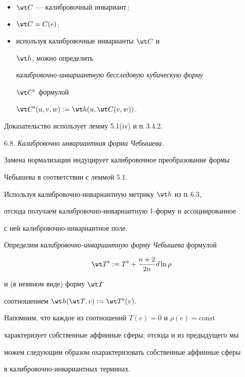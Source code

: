 \begin{itemize}

\item[(i)] $\wt C$ --- калибровочный инвариант\,;

\item[(ii)] $\wt C = C(e)$;

\item[(iii)] используя калибровочные инварианты $\wt C$ и

$\wt h$, можно определить

{\it калибровочно-ин\-ва\-ри\-ант\-ную бесследовую кубическую форму}

$\wt C^{\flat}$ формулой

$\wt C^{\flat}(u,v,w):= \wt h (u,\wt C (v,w))$.

\end{itemize}



Доказательство использует лемму 5.1(iv) и п.\,3.4.2.

\medskip



6.8. {\it Калибровочно инвариантная форма Чебышева.}

Замена нормализации индуцирует калибровочное преобразование формы

Чебышева в соответствии с леммой 5.1.

Используя ка\-либ\-ро\-воч\-но-инвариантную метрику $\wt h$ из п.\,6.3, 

отсюда получаем калибровочно-инвариантную 1-форму и ассоциированное

с ней калибровочно-инвариантное поле.

Определим {\it калибровочно-инвариантную форму Чебышева} формулой

$$

\wt T^{\flat}:= T^{\flat} + \frac {n+2}{2n} d \ln \rho

$$

и (в неявном виде) форму $\wt T$

соотношением $\wt h(\wt T,v) :=\wt T^{\flat}(v)$.

Напомним, что каждое из соотношений $T(e)=0$ и $\rho (e) = \mathrm{const}$

характеризует собственные аффинные сферы; отсюда и из предыдущего мы

можем следующим образом охарактеризовать собственные аффинные сферы

в калибровочно-инвариантных терминах.

\smallskip



